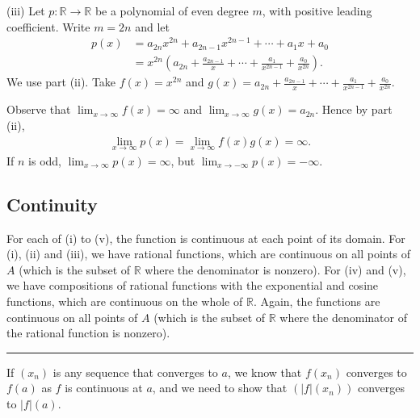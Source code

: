 \documentclass[letterpaper,10pt,english]{jupyterBook}
\begin{document}
\sphinxAtStartPar
(iii) Let \(p:\mathbb{R}\to\mathbb{R}\) be a polynomial of even degree \(m\), with positive leading coefficient. Write \(m = 2n\) and let
\begin{align*}
p(x) &= a_{2n}x^{2n} + a_{2n-1}x^{2n-1} + \cdots + a_{1}x + a_{0}\\
&= x^{2n}\left(a_{2n} + \frac{a_{2n-1}}{x} + \cdots + \frac{a_{1}}{x^{2n-1}} + \frac{a_{0}}{x^{2n}}\right). 
\end{align*}
\sphinxAtStartPar
We use part (ii). Take \(f(x) = x^{2n}\) and \(\displaystyle g(x) = a_{2n} + \frac{a_{2n-1}}{x} + \cdots + \frac{a_{1}}{x^{2n-1}} + \frac{a_{0}}{x^{2n}}\).

Observe that \(\displaystyle\lim_{x \rightarrow \infty}f(x) = \infty\) and \(\displaystyle\lim_{x \rightarrow \infty}g(x) = a_{2n}\). Hence by part (ii),
\begin{equation*}
\begin{split}
\lim_{x \rightarrow \infty}p(x) = \lim_{x \rightarrow \infty}f(x)g(x) = \infty.
\end{split}
\end{equation*}
\sphinxAtStartPar
If \(n\) is odd, \(\lim_{x \rightarrow \infty}p(x) = \infty\), but \(\lim_{x \rightarrow -\infty}p(x) = -\infty\).


\subsection{Continuity}
\label{\detokenize{Solutions-full:continuity}}\label{\detokenize{Solutions-full:ch3sol}}
\sphinxAtStartPar
{\hyperref[\detokenize{Problems:id13}]{}} For each of (i) to (v), the function is continuous at each point of its domain. For (i), (ii) and (iii), we have rational functions, which are continuous on all points of \(A\) (which is the subset of \(\mathbb{R}\) where the denominator is non\sphinxhyphen{}zero). For (iv) and (v), we have compositions of rational functions with the exponential and cosine functions, which are continuous on the whole of \(\mathbb{R}\). Again, the functions are continuous on all points of \(A\) (which is the subset of \(\mathbb{R}\) where the denominator of the rational function is non\sphinxhyphen{}zero).


\bigskip\hrule\bigskip


\sphinxAtStartPar
{\hyperref[\detokenize{Problems:id14}]{}} If \((x_{n})\) is any sequence that converges to \(a\), we know that \(f(x_n)\) converges to \(f(a)\) as \(f\) is continuous at \(a\), and
we need to show that \((|f|(x_n))\) converges to \(|f|(a)\).
\end{document}
